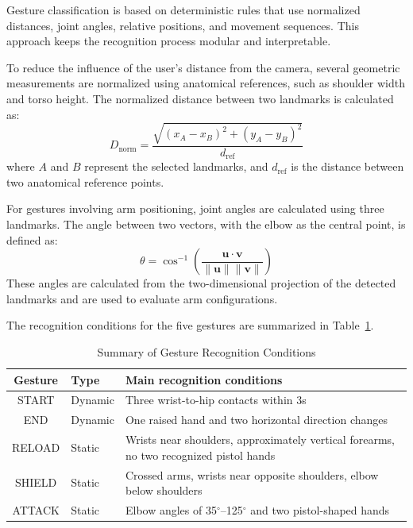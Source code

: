 \documentclass[lettersize,journal]{IEEEtran}
\begin{document}
	Gesture classification is based on deterministic rules that use normalized distances, joint angles, relative positions, and movement sequences. This approach keeps the recognition process modular and interpretable.

	To reduce the influence of the user's distance from the camera, several geometric measurements are normalized using anatomical references, such as shoulder width and torso height. The normalized distance between two landmarks is calculated as:
	\begin{equation}
		D_{\text{norm}} = \frac{\sqrt{(x_A - x_B)^2 + (y_A - y_B)^2}}{d_{\text{ref}}}
	\end{equation}
	where $A$ and $B$ represent the selected landmarks, and $d_{\text{ref}}$ is the distance between two anatomical reference points.
	
	For gestures involving arm positioning, joint angles are calculated using three landmarks. The angle between two vectors, with the elbow as the central point, is defined as:
	\begin{equation}
		\theta = \cos^{-1}\left( \frac{\mathbf{u} \cdot \mathbf{v}}{\|\mathbf{u}\| \|\mathbf{v}\|} \right)
	\end{equation}
	These angles are calculated from the two-dimensional projection of the detected landmarks and are used to evaluate arm configurations.
	
	The recognition conditions for the five gestures are summarized in Table~\ref{tab:gesture_conditions}.

	\begin{table}[!t]
		\centering
		\caption{Summary of Gesture Recognition Conditions}
		\label{tab:gesture_conditions}
		\vspace{0.5em}
		\begin{tabularx}{\columnwidth}{@{}c l X@{}}
			\toprule
			\textbf{Gesture} & \textbf{Type} & \textbf{Main recognition conditions} \\
			\midrule
			START & Dynamic & Three wrist-to-hip contacts within 3s \\
			END & Dynamic & One raised hand and two horizontal direction changes \\
			RELOAD & Static & Wrists near shoulders, approximately vertical forearms, no two recognized pistol hands \\
			SHIELD & Static & Crossed arms, wrists near opposite shoulders, elbow below shoulders \\
			ATTACK & Static & Elbow angles of 35$^\circ$--125$^\circ$ and two pistol-shaped hands \\
			\bottomrule
		\end{tabularx}
	\end{table}
	
\end{document}
